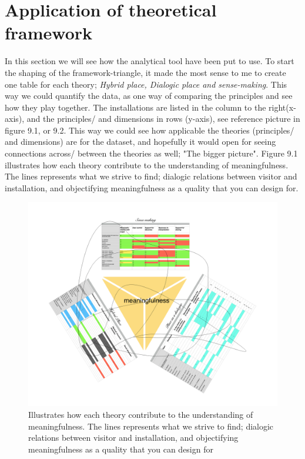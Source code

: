 \section{Application of theoretical framework}
In this section we will see how the analytical tool have been put to use. To start the shaping of the framework-triangle, it made the most sense to me to create one table for each theory; \emph{Hybrid place, Dialogic place and sense-making}. This way we could quantify the data, as one way of comparing the principles and see how they play together. The installations are listed in the column to the right(x-axis), and the principles/ and dimensions in rows (y-axis), see reference picture in figure 9.1, or 9.2. This way we could see how applicable the theories (principles/ and dimensions) are for the dataset, and hopefully it would open for seeing connections across/ between the theories as well; "The bigger picture". Figure 9.1 illustrates how each theory contribute to the understanding of meaningfulness. The lines represents what we strive to find; dialogic relations between visitor and installation, and objectifying meaningfulness as a quality that you can design for.

\begin{figure}[H]
\includegraphics[width=14cm]{pictures/analysis/table_triangle.png}
\caption{Illustrates how each theory contribute to the understanding of meaningfulness. The lines represents what we strive to find; dialogic relations between visitor and installation, and objectifying meaningfulness as a quality that you can design for}
\end{figure}

